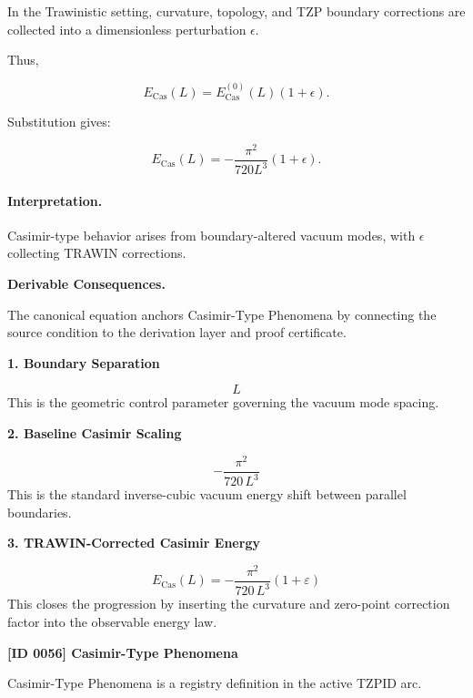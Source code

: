In the Trawinistic setting, curvature, topology, and TZP boundary corrections are collected into a dimensionless perturbation $\epsilon$.

Thus,

\begin{equation}
E_{\mathrm{Cas}}(L)
=
E_{\mathrm{Cas}}^{(0)}(L)(1+\epsilon).
\end{equation}

Substitution gives:

\begin{equation}
\boxed{
E_{\mathrm{Cas}}(L)
=
-\frac{\pi^2}{720L^3}(1+\epsilon).
}
\end{equation}

\paragraph{Interpretation.}
Casimir-type behavior arises from boundary-altered vacuum modes, with $\epsilon$ collecting TRAWIN corrections.

\par\vspace{0.35em}
\noindent\textbf{Derivable Consequences.}\quad
\begingroup
\footnotesize
\raggedright
The canonical equation anchors Casimir-Type Phenomena by connecting the source condition to the derivation layer and proof certificate.
\par\endgroup

\noindent\textbf{1. Boundary Separation}\par
\[
L
\]
\noindent This is the geometric control parameter governing the vacuum mode spacing.\par
\noindent\textbf{2. Baseline Casimir Scaling}\par
\[
-\frac{\pi^{2}}{720\,L^{3}}
\]
\noindent This is the standard inverse-cubic vacuum energy shift between parallel boundaries.\par
\noindent\textbf{3. TRAWIN-Corrected Casimir Energy}\par
\[
E_{\mathrm{Cas}}(L)
=
-\frac{\pi^{2}}{720\,L^{3}}\left(1+\varepsilon\right)
\]
\noindent This closes the progression by inserting the curvature and zero-point correction factor into the observable energy law.\par

\clearpage
\noindent\textbf{[ID 0056] Casimir-Type Phenomena}\par
\vspace{0.35em}
\begingroup\small
{}
Casimir-Type Phenomena is a registry definition in the active TZPID arc.

